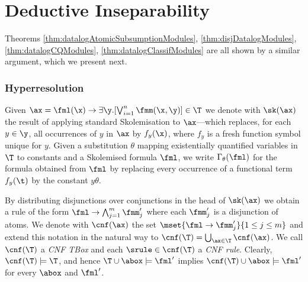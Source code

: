 \section{Deductive Inseparability}



Theorems \ref{thm:datalogAtomicSubsumptionModules}, \ref{thm:disjDatalogModules},
\ref{thm:datalogCQModules},
\ref{thm:datalogClassifModules}
are all shown by a similar argument, which we present next.

\subsubsection{Hyperresolution}
Given $\ax = \fml(\x)\to \exists \y. [\bigvee_{i=1}^n
\fmm(\x,\y)]\in\T$\/ we denote with $\sk(\ax)$ the result of applying
standard Skolemisation to $\ax$---which replaces, for each $y\in\y$,
all occurrences of $y$ in $\ax$ by $f_y(\x)$, where $f_y$ is a fresh
function symbol unique for $y$.  Given a substitution $\theta$ mapping
existentially quantified variables in $\T$ to constants and a
Skolemised formula $\fml$, we write $\Gamma_\theta(\fml)$ for the
formula obtained from $\fml$ by replacing every occurrence of a
functional term $f_y(\t)$ by the constant $y\theta$.

By distributing disjunctions over conjunctions in the head of
$\sk(\ax)$ we obtain a rule of the form $\fml \to \bigwedge_{j=1}^m
\fmm'_j$ where each $\fmm'_j$ is a disjunction of atoms.  We denote
with $\cnf(\ax)$ the set $\mset{\fml \to \fmm'_j}{1\leq j\leq m}$ and
extend this notation in the natural way to $\cnf(\T) =
\bigcup_{\ax\in\T}\cnf(\ax)$.  We call $\cnf(\T)$ a \emph{CNF TBox}
and each $\srule\in\cnf(\T)$ a \emph{CNF rule}.
Clearly, $\cnf(\T)\models\T$, and hence $\T\cup\abox\models \fml'$
implies $\cnf(\T)\cup\abox\models \fml'$ for every $\abox$ and
$\fml'$.


